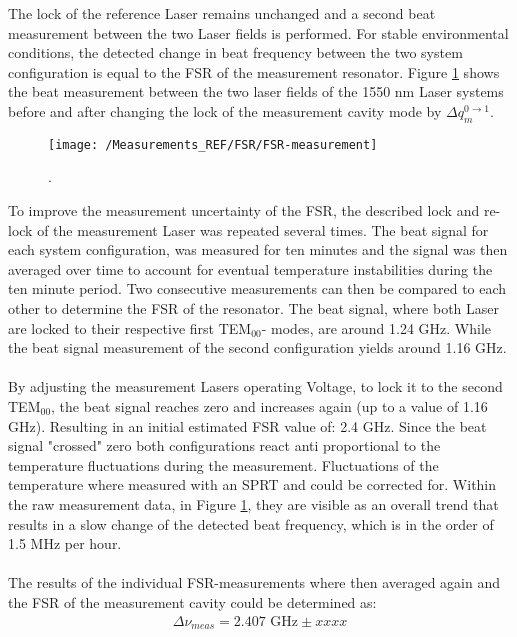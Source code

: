 The lock of the reference Laser remains unchanged and a second beat measurement between the two Laser fields is performed. For stable environmental conditions, the detected change in beat frequency between the two system configuration is equal to the FSR of the measurement resonator. Figure \ref{fig:FSR} shows the beat measurement between the two laser fields of the 1550 nm Laser systems before and after changing the lock of the measurement cavity mode by $\Delta q_m^{0 \rightarrow 1}$. 
\begin{figure}[H]
	\centering
	\texttt{[image: /Measurements\_REF/FSR/FSR-measurement]}
	\caption{.}
	\label{fig:FSR}
\end{figure}
\noindent
To improve the measurement uncertainty of the FSR, the described lock and re-lock of the measurement Laser was repeated several times. The beat signal for each system configuration, was measured for ten minutes and the signal was then averaged over time to account for eventual temperature instabilities during the ten minute period. Two consecutive measurements can then be compared to each other to determine the FSR of the resonator. The beat signal, where both Laser are locked to their respective first TEM$_{00}$- modes, are around 1.24 GHz. While the beat signal measurement of the second configuration yields around 1.16 GHz.
\\\\ By adjusting the measurement Lasers operating Voltage, to lock it to the second TEM$_{00}$, the beat signal reaches zero and increases again (up to a value of 1.16 GHz). Resulting in an initial estimated FSR value of: 2.4 GHz. Since the beat signal "crossed" zero both configurations react anti proportional to the temperature fluctuations during the measurement. Fluctuations of the temperature where measured with an SPRT and could be corrected for. Within the raw measurement data, in Figure \ref{fig:FSR}, they are visible as an overall trend that results in a slow change of the detected beat frequency, which is in the order of 1.5 MHz per hour.\\\\
The results of the individual FSR-measurements where then averaged again and the FSR of the measurement cavity could be determined as:
\begin{align}
	\Delta \nu_{meas}= 2.407 \text{ GHz} \pm xxxx
\end{align}
